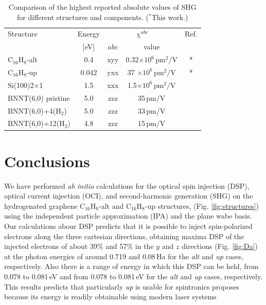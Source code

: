 \documentclass[pss]{wiley2sp} %
\begin{document}
\begin{table}[htb]%
  \sidecaption
  \begin{tabular}{lcccc}
  \hline
    Structure & Energy & \multicolumn{2}{c}{$\chi^{abc} $} &  Ref.\\
    \cline{3-4}
              & [eV]   & $abc$ & value \\
    \hline
    C$_{16}$H$_{8}$-alt   & 0.4   & xyy   & 0.32$\times 10^{6}\,\mathrm{pm}^{2}/\mathrm{V}$  & *     \\
    C$_{16}$H$_{8}$-up    & 0.042 & yxx   & 37 $\times  10^{6}\,\mathrm{pm}^{2}/\mathrm{V}$  & *     \\
    Si(100)2$\times$1     & 1.5   & xxx   & 1.5$\times  10^{6}\,\mathrm{pm}^{2}/\mathrm{V}$  & \cite{andersonPRB15}  \\
    BNNT(6,0) pristine    & 5.0   & zzz   & 35\,pm/V  & \cite{salazarPRB14} \\
    BNNT(6,0)+4(H$_{2}$)  & 5.0   & zzz   & 33\,pm/V  & \cite{salazarPRB14} \\
    BNNT(6,0)+12(H$_{2}$) & 4.8   & zzz   & 15\,pm/V  & \cite{salazarPRB14} \\
  \hline
  \end{tabular}
  \caption[]{%
  Comparison of the highest reported absolute values of SHG for 
    different structures and components. ($^{*}$This work.)}
  \label{tab:shgcomp}
\end{table}



\section{Conclusions}\label{sec:conclusions}

We have performed \emph{ab initio} calculations for the optical spin injection (DSP), optical current injection (OCI), and second-harmonic generation (SHG) on the hydrogenated graphene C$_{16}$H$_{8}$-alt and C$_{16}$H$_{8}$-up structures, (Fig. \ref{fig:structures}) using the independent particle approximation (IPA) and the plane wabe basis. Our calculations abour DSP predicts that it is possible to inject spin-polarized electrons along the three cartesian directions, obtaining maxima DSP of the injected electrons of about 39\% and 57\% in the $y$ and $z$ directions  (Fig. \ref{fig:Da}) at the photon energies of around 0.719 and 0.08\,Ha  for the \emph{alt} and \emph{up} cases, respectively. Also there is a range of energy in which this DSP can be held, from 0.078 to 0.081\,eV and from 0.078 to 0.081\,eV for the \emph{alt} and \emph{up} cases, respectively. This results predicts that particularly \emph{up} is usable for spintronics proposes because its energy is readily obtainable using modern laser systems
\end{document}
